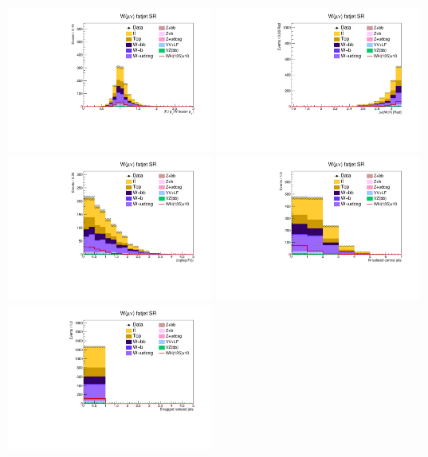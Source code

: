 \begin{figure}[tbp]
  \begin{center}
    \includegraphics[width=0.48\textwidth]{figures/wlnhbb2016/boosted/WmnWHFJSR_fj1WPtBalance.pdf}
    \includegraphics[width=0.48\textwidth]{figures/wlnhbb2016/boosted/WmnWHFJSR_deltaPhiVH.pdf}
    \includegraphics[width=0.48\textwidth]{figures/wlnhbb2016/boosted/WmnWHFJSR_dEtal1fj1.pdf}
    \includegraphics[width=0.48\textwidth]{figures/wlnhbb2016/boosted/WmnWHFJSR_nIsojet.pdf}
    \includegraphics[width=0.48\textwidth]{figures/wlnhbb2016/boosted/WmnWHFJSR_isojetNBtags.pdf}

\end{center}
\end{figure}
